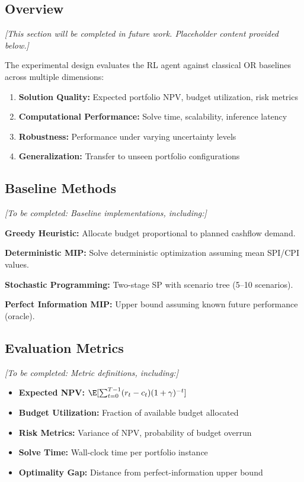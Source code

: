 \subsection{Overview}

\textit{[This section will be completed in future work. Placeholder content provided below.]}

The experimental design evaluates the RL agent against classical OR baselines across multiple dimensions:

\begin{enumerate}
    \item \textbf{Solution Quality:} Expected portfolio NPV, budget utilization, risk metrics
    \item \textbf{Computational Performance:} Solve time, scalability, inference latency
    \item \textbf{Robustness:} Performance under varying uncertainty levels
    \item \textbf{Generalization:} Transfer to unseen portfolio configurations
\end{enumerate}

\subsection{Baseline Methods}

\textit{[To be completed: Baseline implementations, including:]}

\textbf{Greedy Heuristic:} Allocate budget proportional to planned cashflow demand.

\textbf{Deterministic MIP:} Solve deterministic optimization assuming mean SPI/CPI values.

\textbf{Stochastic Programming:} Two-stage SP with scenario tree (5--10 scenarios).

\textbf{Perfect Information MIP:} Upper bound assuming known future performance (oracle).

\subsection{Evaluation Metrics}

\textit{[To be completed: Metric definitions, including:]}

\begin{itemize}
    \item \textbf{Expected NPV:} $\E[\sum_{t=0}^{T-1} (r_t - c_t)(1+\gamma)^{-t}]$
    \item \textbf{Budget Utilization:} Fraction of available budget allocated
    \item \textbf{Risk Metrics:} Variance of NPV, probability of budget overrun
    \item \textbf{Solve Time:} Wall-clock time per portfolio instance
    \item \textbf{Optimality Gap:} Distance from perfect-information upper bound
\end{itemize}

